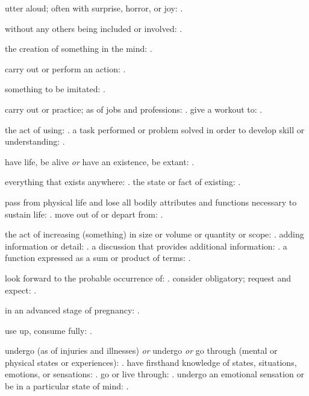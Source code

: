   utter aloud; often with surprise, horror, or joy: .

  without any others being included or involved: .

  the creation of something in the mind: .

  carry out or perform an action: .

  something to be imitated: .

  carry out or practice; as of jobs and professions: . give a workout to: .

  the act of using: . a task performed or problem solved in order to develop skill or understanding: .

  have life, be alive \textit{or} have an existence, be extant: .

  everything that exists anywhere: . the state or fact of existing: .

  pass from physical life and lose all bodily attributes and functions necessary to sustain life: . move out of or depart from: .

  the act of increasing (something) in size or volume or quantity or scope: . adding information or detail: . a discussion that provides additional information: . a function expressed as a sum or product of terms: .

  look forward to the probable occurrence of: . consider obligatory; request and expect: .

  in an advanced stage of pregnancy: .

  use up, consume fully: .

  undergo (as of injuries and illnesses) \textit{or} undergo \textit{or} go through (mental or physical states or experiences): . have firsthand knowledge of states, situations, emotions, or sensations: . go or live through: . undergo an emotional sensation or be in a particular state of mind: .

